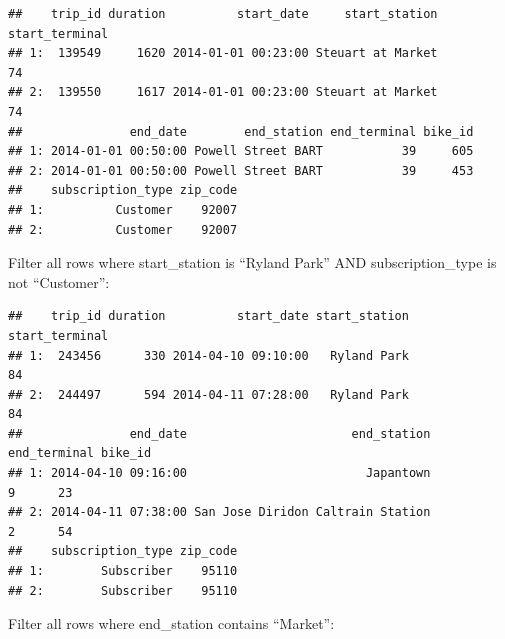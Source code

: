 \documentclass[]{book}
\newenvironment{Shaded}{\begin{snugshade}}{\end{snugshade}}
\newcommand{\DecValTok}[1]{\textcolor[rgb]{0.00,0.00,0.81}{#1}}
\newcommand{\KeywordTok}[1]{\textcolor[rgb]{0.13,0.29,0.53}{\textbf{#1}}}
\newcommand{\NormalTok}[1]{#1}
\newcommand{\OperatorTok}[1]{\textcolor[rgb]{0.81,0.36,0.00}{\textbf{#1}}}
\newcommand{\StringTok}[1]{\textcolor[rgb]{0.31,0.60,0.02}{#1}}
\begin{document}
\begin{verbatim}
##    trip_id duration          start_date     start_station start_terminal
## 1:  139549     1620 2014-01-01 00:23:00 Steuart at Market             74
## 2:  139550     1617 2014-01-01 00:23:00 Steuart at Market             74
##               end_date        end_station end_terminal bike_id
## 1: 2014-01-01 00:50:00 Powell Street BART           39     605
## 2: 2014-01-01 00:50:00 Powell Street BART           39     453
##    subscription_type zip_code
## 1:          Customer    92007
## 2:          Customer    92007
\end{verbatim}

Filter all rows where start\_station is ``Ryland Park'' AND subscription\_type is not ``Customer'':

\begin{Shaded}
\end{Shaded}

\begin{verbatim}
##    trip_id duration          start_date start_station start_terminal
## 1:  243456      330 2014-04-10 09:10:00   Ryland Park             84
## 2:  244497      594 2014-04-11 07:28:00   Ryland Park             84
##               end_date                       end_station end_terminal bike_id
## 1: 2014-04-10 09:16:00                         Japantown            9      23
## 2: 2014-04-11 07:38:00 San Jose Diridon Caltrain Station            2      54
##    subscription_type zip_code
## 1:        Subscriber    95110
## 2:        Subscriber    95110
\end{verbatim}

Filter all rows where end\_station contains ``Market'':

\begin{Shaded}
\end{Shaded}
\end{document}
